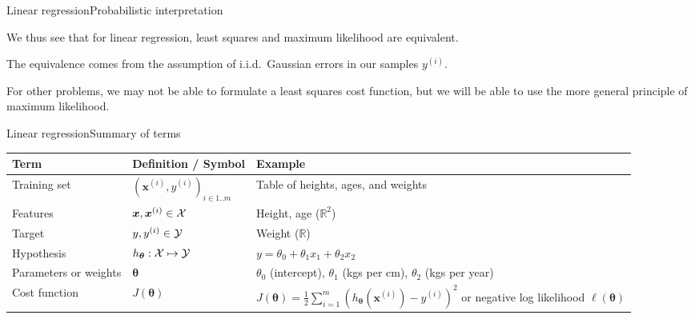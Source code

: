 \documentclass{beamer}
\renewcommand{\vec}[1]{\boldsymbol{#1}}
\def\Rset{\mathbb{R}}
\begin{document}
\begin{frame}{Linear regression}{Probabilistic interpretation}

  We thus see that for linear regression, \alert{least squares and
    maximum likelihood are equivalent}.

  \medskip

  The equivalence comes from the assumption of i.i.d.\ Gaussian errors
  in our samples $y^{(i)}$.
  
  \medskip

  For other problems, we may not be able to formulate a least squares
  cost function, but we will be able to use the more general principle of
  maximum likelihood.

\end{frame}


\begin{frame}{Linear regression}{Summary of terms}

  
  \begin{tabular}{>{\raggedright}p{}>{\raggedright}p{}>{\raggedright\arraybackslash}p{}}
    \hline
    \textbf{Term} & \textbf{Definition / Symbol} & \textbf{Example} \\
    \hline
    Training set & $(\vec{x}^{(i)},y^{(i)})_{i \in 1..m}$ & Table of heights, ages, and weights \\
    \hline
    Features & $\vec{x}, \vec{x}^{(i)} \in {\cal X}$ & Height, age ($\Rset^2$) \\
    \hline
    Target & $y, y^{(i)} \in {\cal Y}$ & Weight ($\Rset$) \\
    \hline
    Hypothesis & $h_{\vec{\theta}} : {\cal X} \mapsto {\cal Y}$ & $y = \theta_0 + \theta_1 x_1 + \theta_2 x_2$ \\
    \hline
    Parameters or weights & $\vec{\theta}$ & $\theta_0$ (intercept), $\theta_1$ (kgs per cm), $\theta_2$ (kgs per year) \\
    \hline
    Cost function & $J(\vec{\theta})$ & $J(\vec{\theta}) = \frac{1}{2}\sum_{i=1}^m(h_{\vec{\theta}}(\vec{x}^{(i)}) - y^{(i)})^2$ or negative log likelihood $\ell(\vec{\theta})$ \\
    \hline
  \end{tabular}

\end{frame}
\end{document}
